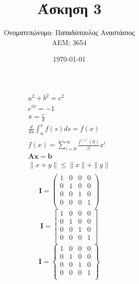 \documentclass{article}
\title{Άσκηση 3}
\author{Ονοματεπώνυμο: Παπαδόπουλος Αναστάσιος \\ 
        ΑΕΜ: 3654}
\date{\today}
\begin{document}
\maketitle

\begin{center}
    \vspace{3mm}

    \begin{gather*}
        a^{2} + b^{2} = c^{2} \\
        e^{i \pi} = -1 \\
        \pi = \frac{c}{d} \\
        \frac{d}{dx} \int_{α}^{x} f(s)ds = f(x) \\
        f(x) = \sum_{i=0}^{\infty} \frac{f^{(i)} (0)}{i!} x^{i} \\
        \mathbf{Ax = b} \\
        \|x + y\| \leq \|x\| + \|y\| \\ 
    \end{gather*}
    \begin{equation}
        \mathbf{I =}
        \begin{pmatrix}
            1 & 0 & 0 & 0 \\
            0 & 1 & 0 & 0 \\
            0 & 0 & 1 & 0 \\
            0 & 0 & 0 & 1 \\
        \end{pmatrix}
    \end{equation}
    \vspace{5mm}
    \begin{equation}
        \mathbf{I =}  
        \begin{bmatrix}
            1 & 0 & 0 & 0 \\
            0 & 1 & 0 & 0 \\
            0 & 0 & 1 & 0 \\
            0 & 0 & 0 & 1 \\
        \end{bmatrix}
    \end{equation}
    \vspace{5mm}
    \begin{equation}
        \mathbf{I =}  
        \begin{Bmatrix}
            1 & 0 & 0 & 0 \\
            0 & 1 & 0 & 0 \\
            0 & 0 & 1 & 0 \\
            0 & 0 & 0 & 1 \\

\end{Bmatrix}
\end{equation}
\end{center}
\end{document}
